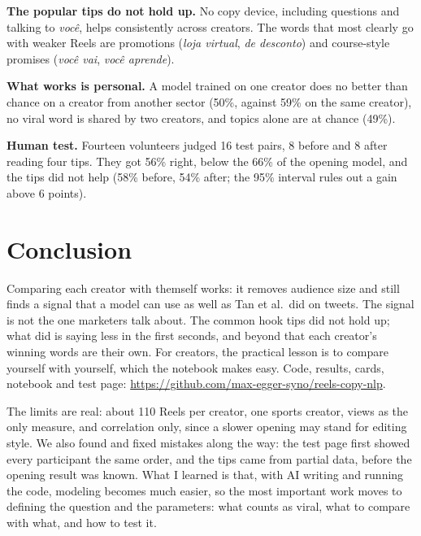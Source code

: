 \documentclass[conference]{IEEEtran}
\begin{document}
\textbf{The popular tips do not hold up.} No copy device, including questions and talking to \textit{voc\^e}, helps consistently across creators.
The words that most clearly go with weaker Reels are promotions (\textit{loja virtual}, \textit{de desconto}) and course-style promises (\textit{voc\^e vai}, \textit{voc\^e aprende}).

\textbf{What works is personal.} A model trained on one creator does no better than chance on a creator from another sector (50\%, against 59\% on the same creator), no viral word is shared by two creators, and topics alone are at chance (49\%).

\textbf{Human test.} Fourteen volunteers judged 16 test pairs, 8 before and 8 after reading four tips.
They got 56\% right, below the 66\% of the opening model, and the tips did not help (58\% before, 54\% after; the 95\% interval rules out a gain above 6 points).

\section{Conclusion}
Comparing each creator with themself works: it removes audience size and still finds a signal that a model can use as well as Tan et al.\ did on tweets.
The signal is not the one marketers talk about.
The common hook tips did not hold up; what did is saying less in the first seconds, and beyond that each creator's winning words are their own.
For creators, the practical lesson is to compare yourself with yourself, which the notebook makes easy.
Code, results, cards, notebook and test page: \url{https://github.com/max-egger-syno/reels-copy-nlp}.

The limits are real: about 110 Reels per creator, one sports creator, views as the only measure, and correlation only, since a slower opening may stand for editing style.
We also found and fixed mistakes along the way: the test page first showed every participant the same order, and the tips came from partial data, before the opening result was known.
What I learned is that, with AI writing and running the code, modeling becomes much easier, so the most important work moves to defining the question and the parameters: what counts as viral, what to compare with what, and how to test it.
\end{document}
